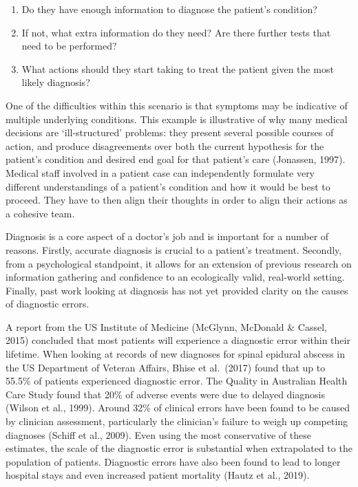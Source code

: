 \documentclass[a4paper, nobind]{templates/ociamthesis}
\providecommand{\tightlist}{%
  \setlength{\itemsep}{0pt}\setlength{\parskip}{0pt}}
\begin{document}
\begin{enumerate}
\def\labelenumi{\arabic{enumi}.}
\tightlist
\item
  Do they have enough information to diagnose the patient's condition?
\item
  If not, what extra information do they need? Are there further tests that need to be performed?
\item
  What actions should they start taking to treat the patient given the most likely diagnosis?
\end{enumerate}

One of the difficulties within this scenario is that symptoms may be indicative of multiple underlying conditions. This example is illustrative of why many medical decisions are `ill-structured' problems: they present several possible courses of action, and produce disagreements over both the current hypothesis for the patient's condition and desired end goal for that patient's care (Jonassen, 1997). Medical staff involved in a patient case can independently formulate very different understandings of a patient's condition and how it would be best to proceed. They have to then align their thoughts in order to align their actions as a cohesive team.

Diagnosis is a core aspect of a doctor's job and is important for a number of reasons. Firstly, accurate diagnosis is crucial to a patient's treatment. Secondly, from a psychological standpoint, it allows for an extension of previous research on information gathering and confidence to an ecologically valid, real-world setting. Finally, past work looking at diagnosis has not yet provided clarity on the causes of diagnostic errors.

A report from the US Institute of Medicine (McGlynn, McDonald \& Cassel, 2015) concluded that most patients will experience a diagnostic error within their lifetime. When looking at records of new diagnoses for spinal epidural abscess in the US Department of Veteran Affairs, Bhise et al.~(2017) found that up to 55.5\% of patients experienced diagnostic error. The Quality in Australian Health Care Study found that 20\% of adverse events were due to delayed diagnosis (Wilson et al., 1999). Around 32\% of clinical errors have been found to be caused by clinician assessment, particularly the clinician's failure to weigh up competing diagnoses (Schiff et al., 2009). Even using the most conservative of these estimates, the scale of the diagnostic error is substantial when extrapolated to the population of patients. Diagnostic errors have also been found to lead to longer hospital stays and even increased patient mortality (Hautz et al., 2019).
\end{document}
